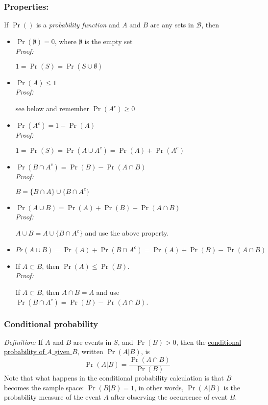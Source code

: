 \subsubsection*{Properties:}
If $\Pr()$ is a {\it probability function} and $A$ and $B$ are any sets in $\mathcal{B}$, then
\begin{itemize}
  \item $\Pr(\emptyset) = 0$, where $\emptyset$ is the empty set\\
  {\it Proof: }
  \begin{pf}
  $1 = \Pr(S) = \Pr(S \cup \emptyset)$
  \end{pf}
  \item $\Pr(A) \le 1$\\
  {\it Proof: }
  \begin{pf}
   see below and remember $\Pr(A^c) \ge 0$
  \end{pf}
  \item $\Pr(A^c) = 1 - \Pr(A)$\\
  {\it Proof: }
  \begin{pf}
  $1 = \Pr(S) = \Pr(A \cup A^c) = \Pr(A ) + \Pr(A^c)$
  \end{pf}  
  \item $\Pr(B \cap A^c) = \Pr(B) - \Pr(A \cap B)$\\
  {\it Proof: }
  \begin{pf}
  $B = \{B \cap A\} \cup \{ B \cap A^c\}$
  \end{pf}
  \item $\Pr(A \cup B) = \Pr(A) + \Pr(B) - \Pr(A \cap B)$\\
  {\it Proof: }
  \begin{pf}
  $A \cup B = A \cup \{ B \cap A^c \}$ and use the above property.
  \end{pf}  
  \item $Pr(A \cup B) = \Pr(A) + \Pr(B \cap A^c) = \Pr(A) + \Pr(B) - \Pr(A \cap B)$
  \item If $A \subset B$, then $\Pr(A) \le \Pr(B)$.\\
  {\it Proof:}
  \begin{pf}
  If $A \subset B$, then $A \cap B = A$ and use $\Pr(B \cap A^c) = \Pr(B) - \Pr(A \cap B)$.
  \end{pf}
\end{itemize}

\subsubsection*{Conditional probability}
{\it Definition: } If $A$ and $B$ are events in $S$, and $\Pr(B) > 0$, then the \underline{conditional probability of $A$ given $B$}, written $\Pr(A | B)$, is
$$
\Pr(A | B) = \frac{\Pr(A \cap B)}{\Pr(B)}
$$
Note that what happens in the conditional probability calculation is that $B$ becomes the sample space: $\Pr(B|B) = 1$, in other words, 
$\Pr(A|B)$ is the probability measure of the event $A$ after observing the occurrence of event $B$.


